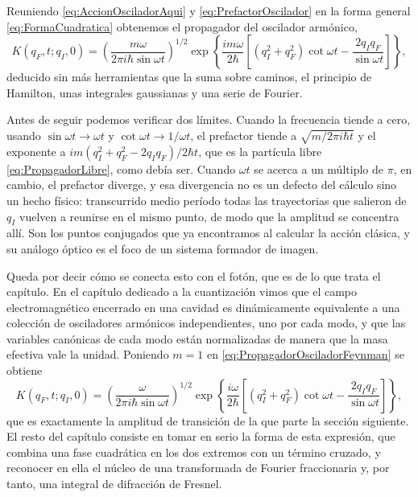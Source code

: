         Reuniendo \eqref{eq:AccionOsciladorAqui} y \eqref{eq:PrefactorOscilador} en la forma general \eqref{eq:FormaCuadratica} obtenemos el propagador del oscilador armónico,
        \begin{equation}\label{eq:PropagadorOsciladorFeynman}
            K(q_{F},t;q_{I},0) = \left(\frac{m\omega}{2\pi i\hbar\sin\omega t}\right)^{1/2}
            \exp\left\{\frac{i m\omega}{2\hbar}\left[\left(q_{I}^{2}+q_{F}^{2}\right)\cot\omega t - \frac{2q_{I}q_{F}}{\sin\omega t}\right]\right\},
        \end{equation}
        deducido sin más herramientas que la suma sobre caminos, el principio de Hamilton, unas integrales gaussianas y una serie de Fourier.

        Antes de seguir podemos verificar dos límites. Cuando la frecuencia tiende a cero, usando $\sin\omega t\to\omega t$ y $\cot\omega t\to 1/\omega t$, el prefactor tiende a $\sqrt{m/2\pi i\hbar t}$ y el exponente a $im(q_{I}^{2}+q_{F}^{2}-2q_{I}q_{F})/2\hbar t$, que es la partícula libre \eqref{eq:PropagadorLibre}, como debía ser. Cuando $\omega t$ se acerca a un múltiplo de $\pi$, en cambio, el prefactor diverge, y esa divergencia no es un defecto del cálculo sino un hecho físico: transcurrido medio período todas las trayectorias que salieron de $q_{I}$ vuelven a reunirse en el mismo punto, de modo que la amplitud se concentra allí. Son los puntos conjugados que ya encontramos al calcular la acción clásica, y su análogo óptico es el foco de un sistema formador de imagen.

        Queda por decir cómo se conecta esto con el fotón, que es de lo que trata el capítulo. En el capítulo dedicado a la cuantización vimos que el campo electromagnético encerrado en una cavidad es dinámicamente equivalente a una colección de osciladores armónicos independientes, uno por cada modo, y que las variables canónicas de cada modo están normalizadas de manera que la masa efectiva vale la unidad. Poniendo $m=1$ en \eqref{eq:PropagadorOsciladorFeynman} se obtiene
        \begin{equation}\label{eq:PropagadorModo}
            K(q_{F},t;q_{I},0) = \left(\frac{\omega}{2\pi i\hbar\sin\omega t}\right)^{1/2}
            \exp\left\{\frac{i\omega}{2\hbar}\left[\left(q_{I}^{2}+q_{F}^{2}\right)\cot\omega t - \frac{2q_{I}q_{F}}{\sin\omega t}\right]\right\},
        \end{equation}
        que es exactamente la amplitud de transición de la que parte la sección siguiente. El resto del capítulo consiste en tomar en serio la forma de esta expresión, que combina una fase cuadrática en los dos extremos con un término cruzado, y reconocer en ella el núcleo de una transformada de Fourier fraccionaria y, por tanto, una integral de difracción de Fresnel.

